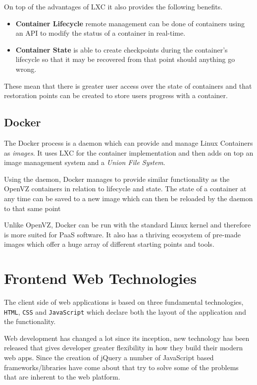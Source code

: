 On top of the advantages of LXC it also provides the following benefits.

\begin{itemize}
    \item \textbf{Container Lifecycle} remote management can be done of containers using an API to modify the status of a container in real-time. 
    \item \textbf{Container State} is able to create checkpoints during the container's lifecycle so that it may be recovered from that point should anything go wrong.
\end{itemize}

These mean that there is greater user access over the state of containers and that restoration points can be created to store users progress with a container.

\subsection{Docker}

The Docker process is a daemon which can provide and manage Linux Containers as \textit{images}. It uses LXC for the container implementation and then adds on top an image management system and a \textit{Union File System}.

Using the daemon, Docker manages to provide similar functionality as the OpenVZ containers in relation to lifecycle and state. The state of a container at any time can be saved to a new image which can then be reloaded by the daemon to that same point

Unlike OpenVZ, Docker can be run with the standard Linux kernel and therefore is more suited for PaaS software. It also has a thriving ecosystem of pre-made images which offer a huge array of different starting points and tools.


\section{Frontend Web Technologies} \label{lit-frontend}

The client side of web applications is based on three fundamental technologies, \texttt{HTML}, \texttt{CSS} and \texttt{JavaScript} which declare both the layout of the application and the functionality.

Web development has changed a lot since its inception, new technology has been released that gives developer greater flexibility in how they build their modern web apps. Since the creation of jQuery \cite{jquery} a number of JavaScript based frameworks/libraries have come about that try to solve some of the problems that are inherent to the web platform.

